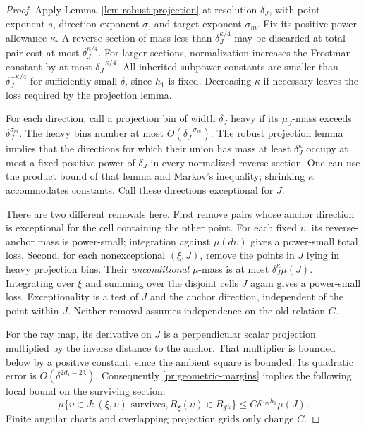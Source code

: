 \begin{proof}
Apply Lemma~\ref{lem:robust-projection} at resolution $\delta_J$,
with point exponent $s$, direction exponent $\sigma$, and target
exponent $\sigma_m$. Fix its positive power allowance $\kappa$.
A reverse section of mass less than $\delta_J^{\kappa/4}$ may be
discarded at total pair cost at most $\delta_J^{\kappa/4}$.
For larger sections, normalization increases the Frostman constant
by at most $\delta_J^{-\kappa/4}$. All inherited subpower constants
are smaller than $\delta_J^{-\kappa/4}$ for sufficiently small
$\delta$, since $h_1$ is fixed. Decreasing $\kappa$ if necessary
leaves the loss required by the projection lemma.

For each direction, call a projection bin of width $\delta_J$
heavy if its $\mu_J$-mass exceeds $\delta_J^{\sigma_m}$.
The heavy bins number at most $O(\delta_J^{-\sigma_m})$.
The robust projection lemma implies that the directions for which
their union has mass at least $\delta_J^\kappa$ occupy at most a
fixed positive power of $\delta_J$ in every normalized reverse
section. One can use the product bound of that lemma and Markov's
inequality; shrinking $\kappa$ accommodates constants.
Call these directions exceptional for $J$.

There are two different removals here. First remove pairs whose
anchor direction is exceptional for the cell containing the other
point. For each fixed $\upsilon$, its reverse-anchor mass is
power-small; integration against $\mu(d\upsilon)$ gives a
power-small total loss. Second, for each nonexceptional $(\xi,J)$,
remove the points in $J$ lying in heavy projection bins.
Their \emph{unconditional} $\mu$-mass is at most
$\delta_J^\kappa\mu(J)$. Integrating over $\xi$ and summing over
the disjoint cells $J$ again gives a power-small loss.
Exceptionality is a test of $J$ and the anchor direction, independent
of the point within $J$. Neither removal assumes independence on
the old relation $G$.

For the ray map, its derivative on $J$ is a perpendicular scalar
projection multiplied by the inverse distance to the anchor.
That multiplier is bounded below by a positive constant, since the
ambient square is bounded. Its quadratic error is
$O(\delta^{2d_1-2\lambda})$. Consequently
\eqref{pr:geometric-margins} implies the following local bound on
the surviving section:
\begin{equation}
 \mu\{\upsilon\in J:(\xi,\upsilon)\text{ survives},
                R_\xi(\upsilon)\in B_{\delta^{d_2}}\}
 \le C\delta^{\sigma_m h_1}\mu(J).
\label{pr:local-ray}
\end{equation}
Finite angular charts and overlapping projection grids only change
$C$.


\end{proof}
